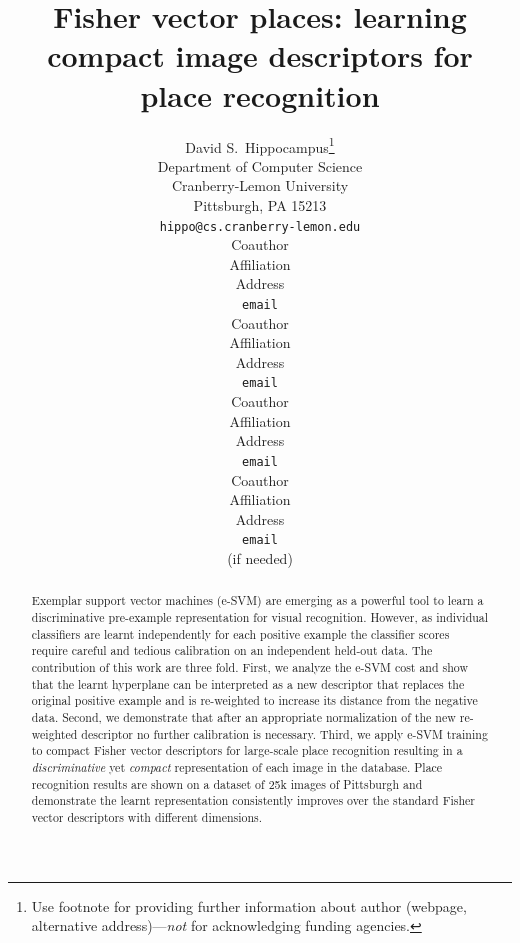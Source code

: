 \documentclass[table]{article} %
\title{Fisher vector places: learning compact image descriptors for place recognition}
\author{
David S.~Hippocampus\thanks{ Use footnote for providing further information
about author (webpage, alternative address)---\emph{not} for acknowledging
funding agencies.} \\
Department of Computer Science\\
Cranberry-Lemon University\\
Pittsburgh, PA 15213 \\
\texttt{hippo@cs.cranberry-lemon.edu} \\
\And
Coauthor \\
Affiliation \\
Address \\
\texttt{email} \\
\AND
Coauthor \\
Affiliation \\
Address \\
\texttt{email} \\
\And
Coauthor \\
Affiliation \\
Address \\
\texttt{email} \\
\And
Coauthor \\
Affiliation \\
Address \\
\texttt{email} \\
(if needed)\\
}
\begin{document}
{%
    \maketitle
    \begin{center}
        \centering
        \vspace*{-10mm}
        \fbox{\rule[-.5cm]{0cm}{4cm} \rule[-.5cm]{14cm}{0cm}}
    \end{center}%
}

\begin{abstract}
		
Exemplar support vector machines (e-SVM) are emerging as a powerful tool to learn a discriminative pre-example representation for
visual recognition. However, as individual classifiers are learnt independently for each positive example the classifier scores require careful and tedious calibration on an independent held-out data. 
The contribution of this work are three fold.
First, we analyze the e-SVM cost and show that the learnt hyperplane can be interpreted
as a new descriptor that replaces the original positive example and is re-weighted to increase its distance from the negative data.
Second, we demonstrate that after an appropriate normalization of the new re-weighted descriptor no further calibration is necessary. %
Third, we apply e-SVM training to compact Fisher vector descriptors for large-scale place recognition resulting in  
a {\em discriminative} yet {\em compact} representation of each image in the database. 
Place recognition results are shown on a dataset of 25k images of Pittsburgh and demonstrate the learnt representation
consistently improves over the standard Fisher vector descriptors with different dimensions. 
\end{abstract}
\end{document}
